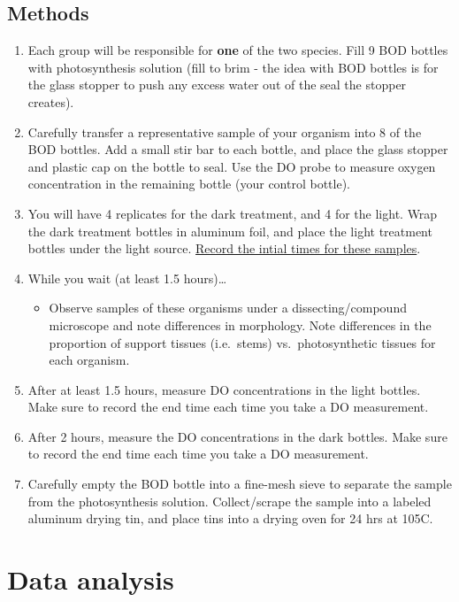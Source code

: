 \documentclass[]{book}
\providecommand{\tightlist}{%
  \setlength{\itemsep}{0pt}\setlength{\parskip}{0pt}}
\begin{document}
\hypertarget{methods}{%
\subsection{Methods}\label{methods}}

\begin{enumerate}
\def\labelenumi{\arabic{enumi}.}
\tightlist
\item
  Each group will be responsible for \textbf{one} of the two species. Fill 9 BOD bottles with photosynthesis solution (fill to brim - the idea with BOD bottles is for the glass stopper to push any excess water out of the seal the stopper creates).
\item
  Carefully transfer a representative sample of your organism into 8 of the BOD bottles. Add a small stir bar to each bottle, and place the glass stopper and plastic cap on the bottle to seal. Use the DO probe to measure oxygen concentration in the remaining bottle (your control bottle).
\item
  You will have 4 replicates for the dark treatment, and 4 for the light. Wrap the dark treatment bottles in aluminum foil, and place the light treatment bottles under the light source. \underline{Record the intial times for these samples}.
\item
  While you wait (at least 1.5 hours)\ldots{}

  \begin{itemize}
  \tightlist
  \item
    Observe samples of these organisms under a dissecting/compound microscope and note differences in morphology. Note differences in the proportion of support tissues (i.e.~stems) vs.~photosynthetic tissues for each organism.
  \end{itemize}
\item
  After at least 1.5 hours, measure DO concentrations in the light bottles. Make sure to record the end time each time you take a DO measurement.
\item
  After 2 hours, measure the DO concentrations in the dark bottles. Make sure to record the end time each time you take a DO measurement.
\item
  Carefully empty the BOD bottle into a fine-mesh sieve to separate the sample from the photosynthesis solution. Collect/scrape the sample into a labeled aluminum drying tin, and place tins into a drying oven for 24 hrs at 105\textdegree{}C.
\end{enumerate}

\hypertarget{data-analysis}{%
\section{Data analysis}\label{data-analysis}}
\end{document}
